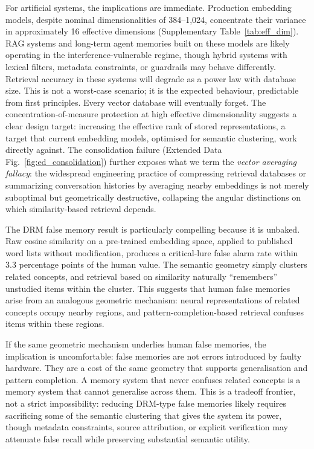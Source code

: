 \documentclass[11pt]{article}
\begin{document}
For artificial systems, the implications are immediate. Production embedding models, despite nominal dimensionalities of 384--1{,}024, concentrate their variance in approximately 16 effective dimensions (Supplementary Table~\ref{tab:eff_dim}). RAG systems and long-term agent memories built on these models are likely operating in the interference-vulnerable regime, though hybrid systems with lexical filters, metadata constraints, or guardrails may behave differently. Retrieval accuracy in these systems will degrade as a power law with database size. This is not a worst-case scenario; it is the expected behaviour, predictable from first principles. Every vector database will eventually forget. The concentration-of-measure protection at high effective dimensionality suggests a clear design target: increasing the effective rank of stored representations, a target that current embedding models, optimised for semantic clustering, work directly against. The consolidation failure (Extended Data Fig.~\ref{fig:ed_consolidation}) further exposes what we term the \textit{vector averaging fallacy}: the widespread engineering practice of compressing retrieval databases or summarizing conversation histories by averaging nearby embeddings is not merely suboptimal but geometrically destructive, collapsing the angular distinctions on which similarity-based retrieval depends.

The DRM false memory result is particularly compelling because it is unbaked. Raw cosine similarity on a pre-trained embedding space, applied to published word lists without modification, produces a critical-lure false alarm rate within 3.3 percentage points of the human value. The semantic geometry simply clusters related concepts, and retrieval based on similarity naturally ``remembers'' unstudied items within the cluster. This suggests that human false memories arise from an analogous geometric mechanism: neural representations of related concepts occupy nearby regions, and pattern-completion-based retrieval confuses items within these regions.

If the same geometric mechanism underlies human false memories, the implication is uncomfortable: false memories are not errors introduced by faulty hardware. They are a cost of the same geometry that supports generalisation and pattern completion. A memory system that never confuses related concepts is a memory system that cannot generalise across them. This is a tradeoff frontier, not a strict impossibility: reducing DRM-type false memories likely requires sacrificing some of the semantic clustering that gives the system its power, though metadata constraints, source attribution, or explicit verification may attenuate false recall while preserving substantial semantic utility.
\end{document}

